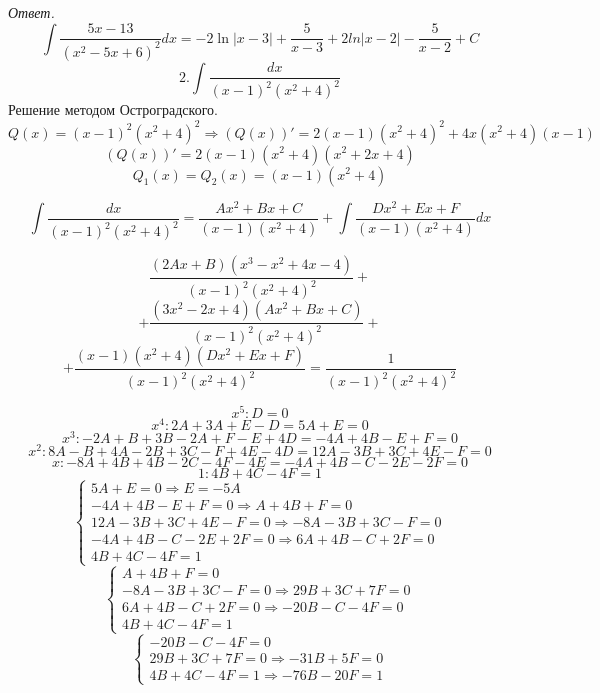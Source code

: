 \documentclass{article}
\begin{document}
	\emph{Ответ.} $$\int\frac{5x-13}{(x^2-5x+6)^2}dx = -2\ln|x - 3| + \frac{5}{x - 3} + 2ln|x - 2| - \frac{5}{x - 2} + C$$
	$$2. \int \frac{dx}{(x-1)^2(x^2+4)^2}$$
	Решение методом Остроградского.
	$$Q(x) = (x-1)^2(x^2+4)^2 \Rightarrow (Q(x))' = 2(x-1)(x^2+4)^2 + 4x(x^2+4)(x-1)$$
	$$(Q(x))' = 2(x-1)(x^2+4)(x^2+2x+4)$$
	$$Q_1(x) = Q_2(x) = (x-1)(x^2+4)$$

	$$\int\frac{dx}{(x-1)^2(x^2+4)^2} = \frac{Ax^2 + Bx + C}{(x-1)(x^2+4)} + \int\frac{Dx^2 + Ex + F}{(x-1)(x^2+4)}dx$$

	$$\frac{(2Ax + B)(x^3 - x^2 + 4x - 4)}{(x-1)^2(x^2+4)^2} +$$
	$$+ \frac{(3x^2 - 2x + 4)(Ax^2+Bx+C)}{(x-1)^2(x^2+4)^2} +$$
	$$+ \frac{(x - 1)(x^2+4)(Dx^2 + Ex + F)}{(x-1)^2(x^2+4)^2} = \frac{1}{(x-1)^2(x^2+4)^2}$$

	$$x^5: D = 0$$
	$$x^4: 2A + 3A + E - D = 5A + E = 0$$
	$$x^3: -2A + B + 3B - 2A + F - E + 4D = -4A + 4B - E + F = 0$$
	$$x^2: 8A - B + 4A - 2B + 3C - F + 4E - 4D = 12A -3B + 3C + 4E - F = 0$$
	$$x: -8A + 4B + 4B - 2C - 4F - 4E = -4A + 4B - C - 2E - 2F = 0$$
	$$1: 4B + 4C - 4F = 1$$
	\begin{equation*}
		\begin{cases}
			5A + E = 0 \Rightarrow E = -5A\\
			-4A + 4B - E + F = 0 \Rightarrow A + 4B + F = 0\\
			12A - 3B + 3C + 4E - F = 0 \Rightarrow -8A - 3B + 3C - F = 0\\
			-4A + 4B - C - 2E + 2F = 0 \Rightarrow 6A + 4B - C + 2F = 0\\
			4B + 4C - 4F = 1
		\end{cases}
	\end{equation*}
	\begin{equation*}
		\begin{cases}
			A + 4B + F = 0 \\
			-8A - 3B + 3C - F = 0 \Rightarrow 29B + 3C + 7F = 0\\
			6A + 4B - C + 2F = 0 \Rightarrow -20B - C - 4F = 0\\
			4B + 4C - 4F = 1
		\end{cases}
	\end{equation*}
	\begin{equation*}
		\begin{cases}
			-20B - C - 4F = 0\\
			29B + 3C + 7F = 0 \Rightarrow -31B + 5F = 0\\
			4B + 4C - 4F = 1 \Rightarrow -76B - 20F = 1
		\end{cases}
	\end{equation*}
\end{document}
